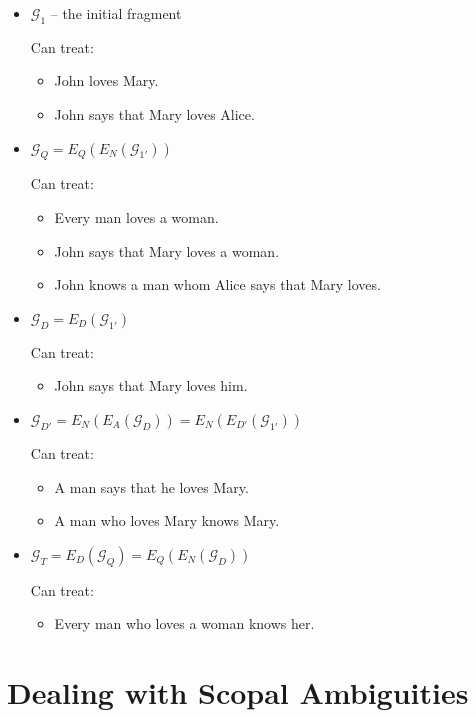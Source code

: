 \documentclass{article}
\begin{document}
\begin{itemize}
\item $\mathcal{G}_1$ -- the initial fragment

  Can treat:
  \begin{itemize}
  \item John loves Mary.
  \item John says that Mary loves Alice.
  \end{itemize}

\item $\mathcal{G}_Q = E_Q(E_N(\mathcal{G}_{1'}))$

  Can treat:
  \begin{itemize}
  \item Every man loves a woman.
  \item John says that Mary loves a woman.
  \item John knows a man whom Alice says that Mary loves.
  \end{itemize}
  
\item $\mathcal{G}_D = E_D(\mathcal{G}_{1'})$

  Can treat:
  \begin{itemize}
  \item John says that Mary loves him.
  \end{itemize}

\item $\mathcal{G}_{D'} = E_N(E_A(\mathcal{G}_D)) = E_N(E_{D'}(\mathcal{G}_{1'}))$

  Can treat:
  \begin{itemize}
  \item A man says that he loves Mary.
  \item A man who loves Mary knows Mary.
  \end{itemize}

\item $\mathcal{G}_T = E_D(\mathcal{G}_Q) = E_Q(E_N(\mathcal{G}_D))$

  Can treat:
  \begin{itemize}
  \item Every man who loves a woman knows her.
  \end{itemize}
\end{itemize}


\section{Dealing with Scopal Ambiguities}
\end{document}
